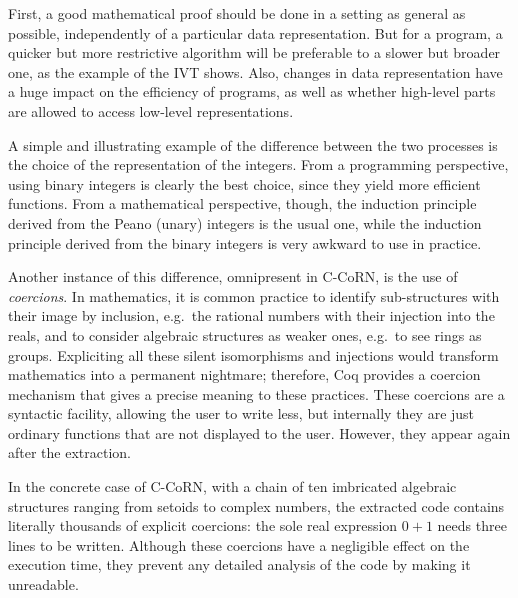 \documentclass{entcs}
\begin{document}
First, a good mathematical proof should be done in a setting
as general as possible, independently of a
particular data representation. But for a program, a quicker but
more restrictive algorithm will be preferable to a slower but broader one, as
the example of the IVT shows. Also, changes in data representation have a huge
impact on the efficiency of programs, as well as whether high-level
parts are allowed to access low-level representations. 

A simple and illustrating example of the difference between the two
processes is the choice of the representation of the integers.
From a programming perspective, using binary integers is clearly the best
choice, since they yield more efficient functions.  From a mathematical
perspective, though,
the induction principle derived from the Peano (unary) integers
is the usual one, while the induction
principle derived from the binary integers is very awkward to use in
practice.

Another instance of this difference, omnipresent in C-CoRN, is the use
of \emph{coercions}.
In mathematics, it is common
practice to identify sub-structures with their image by inclusion, e.g.\
the rational numbers with their injection into the
reals, and to consider algebraic structures as
weaker ones, e.g.\ to see rings as groups.
Expliciting all these silent isomorphisms and injections would
transform mathematics into a permanent nightmare; therefore, Coq
provides a coercion mechanism that gives a precise meaning to
these practices. These coercions are a syntactic
facility, allowing the user to write less, but internally they are just
ordinary functions that are not displayed to the user.  However, they
appear again after the extraction.

In the concrete case of C-CoRN,
with a chain of ten imbricated algebraic structures
ranging from setoids to complex numbers, the extracted code contains
literally thousands of explicit coercions: the sole
real expression $0+1$ needs three lines to be written. Although these
coercions have a negligible effect on the execution time, they prevent
any detailed analysis of the code by making it unreadable.
\end{document}
